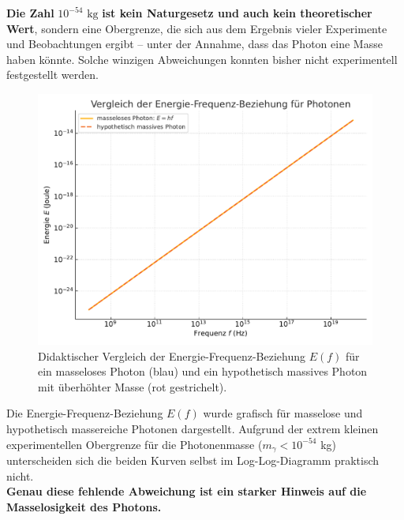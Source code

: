 \textbf{Die Zahl} $10^{-54} \text{ kg}$ 	\textbf{ist kein Naturgesetz und auch kein theoretischer Wert}, sondern eine Obergrenze, die sich aus dem Ergebnis vieler Experimente und Beobachtungen ergibt – unter der Annahme, dass das Photon eine Masse haben könnte.
Solche winzigen Abweichungen konnten bisher nicht experimentell festgestellt werden.

\begin{figure}[H]
	\centering
	\includegraphics[width=0.85\linewidth]{bilder/photon_energie_vergleich_didaktisch.pdf}
	\caption{Didaktischer Vergleich der Energie-Frequenz-Beziehung \( E(f) \) für ein masseloses Photon (blau) und ein hypothetisch massives Photon mit überhöhter Masse (rot gestrichelt). }
	\label{fig:energie_f_masselos_massiv}
\end{figure}
\medskip
\begin{tcolorbox}[hinweisbox, title=Hinweis zur Grafik: Warum sieht man keinen Unterschied?]
	\label{box:Warum sieht man}
	Die Energie-Frequenz-Beziehung $E(f)$ wurde grafisch f\"ur masselose und hypothetisch massereiche Photonen dargestellt. Aufgrund der extrem kleinen experimentellen Obergrenze f\"ur die Photonenmasse ($m_\gamma < 10^{-54}$ kg) unterscheiden sich die beiden Kurven selbst im Log-Log-Diagramm praktisch nicht. \\[1ex]
	\textbf{Genau diese fehlende Abweichung ist ein starker Hinweis auf die Masselosigkeit des Photons.}
\end{tcolorbox}
\medskip
